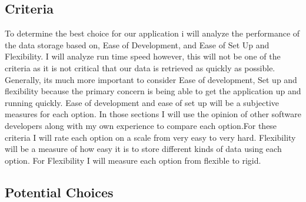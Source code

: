 \documentclass[letterpaper,10pt]{article}
\begin{document}
	\subsection{Criteria}
	 To determine the best choice for our application i will analyze the performance of the data storage based on, Ease of Development, and Ease of Set Up and Flexibility. I will analyze run time speed however, this will not be one of the criteria as it is not critical that our data is retrieved as quickly as possible. Generally, its much more important to consider Ease of development, Set up and flexibility because the primary concern is being able to get the application up and running quickly. Ease of development and ease of set up will be a subjective measures for each option. In those sections I will use the opinion of other software developers along with my own experience to compare each option.For these criteria I will rate each option on a scale from very easy to very hard. Flexibility will be a measure of how easy it is to store different kinds of data using each option. For Flexibility I will measure each option from flexible to rigid.
	\subsection{Potential Choices}
\end{document}
